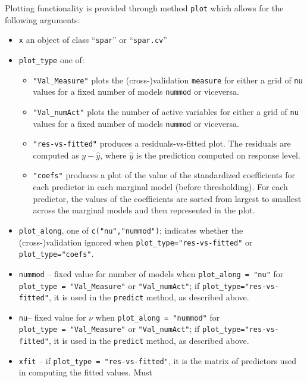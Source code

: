 \documentclass[
  article]{jss}
\begin{document}
Plotting functionality is provided through method \texttt{plot} which
allows for the following arguments:

\begin{itemize}
\item
  \texttt{x} an object of class ``\texttt{spar}'' or
  ``\texttt{spar.cv}''
\item
  \texttt{plot\_type} one of:

  \begin{itemize}
  \item
    \texttt{"Val\_Measure"} plots the (cross-)validation
    \texttt{measure} for either a grid of \texttt{nu} values for a fixed
    number of models \texttt{nummod} or viceversa.
  \item
    \texttt{"Val\_numAct"} plots the number of active variables for
    either a grid of \texttt{nu} values for a fixed number of models
    \texttt{nummod} or viceversa.
  \item
    \texttt{"res-vs-fitted"} produces a residuals-vs-fitted plot. The
    residuals are computed as \(y- \widehat y\), where \(\widehat y\) is
    the prediction computed on response level.
  \item
    \texttt{"coefs"} produces a plot of the value of the standardized
    coefficients for each predictor in each marginal model (before
    thresholding). For each predictor, the values of the coefficients
    are sorted from largest to smallest across the marginal models and
    then represented in the plot.
  \end{itemize}
\item
  \texttt{plot\_along}, one of \texttt{c("nu","nummod")}; indicates
  whether the (cross-)validation ignored when
  \texttt{plot\_type="res-vs-fitted"} or \texttt{plot\_type="coefs"}.
\item
  \texttt{nummod} -- fixed value for number of models when
  \texttt{plot\_along\ =\ "nu"} for
  \texttt{plot\_type\ =\ "Val\_Measure"} or \texttt{"Val\_numAct"}; if
  \texttt{plot\_type="res-vs-fitted"}, it is used in the
  \texttt{predict} method, as described above.
\item
  \texttt{nu}-- fixed value for \(\nu\) when
  \texttt{plot\_along\ =\ "nummod"} for
  \texttt{plot\_type\ =\ "Val\_Measure"} or \texttt{"Val\_numAct"}; if
  \texttt{plot\_type="res-vs-fitted"}, it is used in the
  \texttt{predict} method, as described above.
\item
  \texttt{xfit} -- if \texttt{plot\_type\ =\ "res-vs-fitted"}, it is the
  matrix of predictors used in computing the fitted values. Must

\end{itemize}
\end{document}
